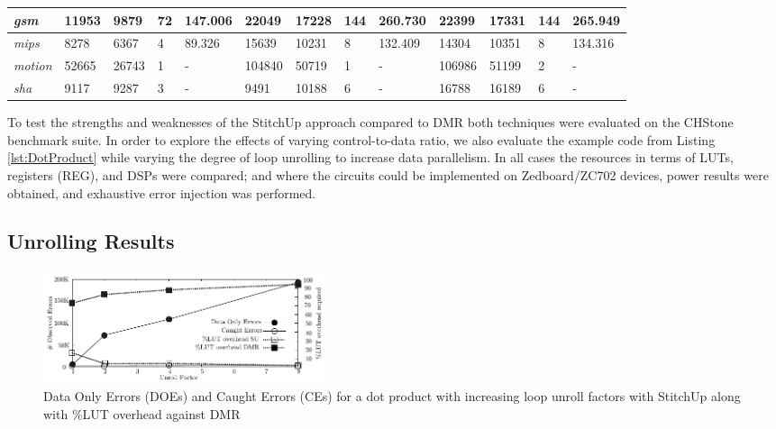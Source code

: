 \begin{table}[t]
\begin{tabular}{@{}|l|l|l|l|l|l|l|l|l|l|l|l|l|@{}}
\textit{gsm}        & 11953        & 9879         & 72           & 147.006        & 22049        & 17228        & 144          & 260.730        & 22399        & 17331        & 144          & 265.949        \\ \midrule
\textit{mips}       & 8278         & 6367         & 4            & 89.326         & 15639        & 10231        & 8            & 132.409        & 14304        & 10351        & 8            & 134.316        \\ \midrule
\textit{motion}     & 52665        & 26743        & 1            & -              & 104840       & 50719        & 1            & -              & 106986       & 51199        & 2            & -              \\ \midrule
\textit{sha}        & 9117         & 9287         & 3            & -              & 9491         & 10188        & 6            & -              & 16788        & 16189        & 6            & -               \\ \bottomrule
\end{tabular}
\end{table}

To test the strengths and weaknesses of the StitchUp approach compared to DMR both techniques were evaluated on the CHStone benchmark suite.
In order to explore the effects of varying control-to-data ratio, we also evaluate the example code from 
Listing \ref{lst:DotProduct} while varying the degree of loop unrolling to increase data parallelism.
In all cases the resources in terms of LUTs, registers (REG), and DSPs were compared; and where the circuits could be implemented
on Zedboard/ZC702 devices, power results were obtained, and exhaustive error injection was performed.

\subsection{Unrolling Results}
\begin{figure}[t]
\centering
\includegraphics[width=3.25in]{./graphs/dp_unrolling_res.pdf}
\caption{Data Only Errors (DOEs) and Caught Errors (CEs) for a dot product with increasing loop unroll factors with StitchUp along with \%LUT overhead against DMR}
\label{fig:dp_unrolling_res}
\end{figure}

